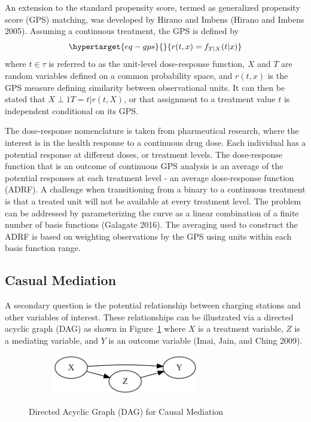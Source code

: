 \documentclass[
  letterpaper,
  DIV=11,
  numbers=noendperiod]{scrartcl}
\begin{document}
An extension to the standard propensity score, termed as generalized
propensity score (GPS) matching, was developed by Hirano and Imbens
(Hirano and Imbens 2005). Assuming a continuous treatment, the GPS is
defined by
\begin{equation}\protect\hypertarget{eq-gps}{}{r(t,x)=f_{T|X}(t|x)}\label{eq-gps}\end{equation}
where \(t\in \tau\) is referred to as the unit-level dose-response
function, \(X\) and \(T\) are random variables defined on a common
probability space, and \(r(t,x)\) is the GPS measure defining similarity
between observational units. It can then be stated that
\(X\perp 1{T=t}|r(t,X)\), or that assignment to a treatment value \(t\)
is independent conditional on its GPS.

The dose-response nomenclature is taken from pharmeutical research,
where the interest is in the health response to a continuous drug dose.
Each individual has a potential response at different doses, or
treatment levels. The dose-response function that is an outcome of
continuous GPS analysis is an average of the potential responses at each
treatment level - an average dose-response function (ADRF). A challenge
when transitioning from a binary to a continuous treatment is that a
treated unit will not be available at every treatment level. The problem
can be addressed by parameterizing the curve as a linear combination of
a finite number of basis functions (Galagate 2016). The averaging used
to construct the ADRF is based on weighting observations by the GPS
using units within each basis function range.

\hypertarget{casual-mediation}{%
\subsection{Casual Mediation}\label{casual-mediation}}

A secondary question is the potential relationship between charging
stations and other variables of interest. These relationships can be
illustrated via a directed acyclic graph (DAG) as shown in
Figure~\ref{fig-dag} where \(X\) is a treatment variable, \(Z\) is a
mediating variable, and \(Y\) is an outcome variable (Imai, Jain, and
Ching 2009).

\begin{figure}

{\centering 

\begin{figure}[H]

{\centering \includegraphics[width=2.52083in,height=0.69792in]{TRB_2023_files/figure-latex/dot-figure-1.png}

}

\end{figure}

}

\caption{\label{fig-dag}Directed Acyclic Graph (DAG) for Causal
Mediation}

\end{figure}
\end{document}
